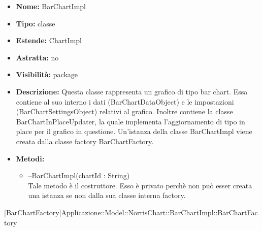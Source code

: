 			
			\begin{itemize}
			\item \textbf{Nome:} BarChartImpl
			\item \textbf{Tipo:} classe
			
		\item \textbf{Estende:}
		ChartImpl
		\item \textbf{Astratta:}
		no
			\item \textbf{Visibilità:} package
			\item \textbf{Descrizione:} Questa classe rappresenta un grafico di tipo bar chart. Essa contiene al suo interno i dati (BarChartDataObject) e le impostazioni (BarChartSettingsObject) relativi al grafico. Inoltre contiene la classe BarChartInPlaceUpdater, la quale implementa l'aggiornamento di tipo in place per il grafico in questione. Un'istanza della classe BarChartImpl viene creata dalla classe factory BarChartFactory.
			\item \textbf{Metodi:}
				\begin{itemize}
				\setlength{\itemsep}{5pt}
				
					\item[\ding{111}] {{--BarChartImpl(chartId : String)}} \\ [1mm] Tale metodo è il costruttore. Esso è privato perchè non può esser creata una istanza se non dalla sua classe interna factory.
				\end{itemize}
		
			\end{itemize}

			
			[BarChartFactory]{Applicazione::Model::NorrisChart::BarChartImpl::BarChartFactory}
			

	
